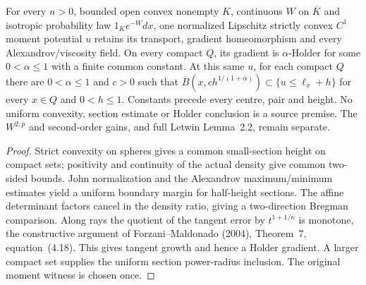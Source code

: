 \begin{lemma}
  \label{lem:convex-gradient-holder}
  \leanok
  For every $n>0$, bounded open convex nonempty $K$, continuous $W$ on $\overline K$
  and isotropic probability law $1_K e^{-W}dx$, one normalized Lipschitz strictly convex
  $C^1$ moment potential $u$ retains its transport, gradient homeomorphism and every
  Alexandrov/viscosity field. On every compact $Q$, its gradient is $\alpha$-Holder
  for some $0<\alpha\le1$ with a finite common constant. At this same $u$, for each
  compact $Q$ there are $0<\alpha\le1$ and $c>0$ such that
  $\overline B(x,ch^{1/(1+\alpha)})\subset\{u\le\ell_x+h\}$ for every $x\in Q$
  and $0<h\le1$. Constants precede every centre, pair and height.
  No uniform convexity, section estimate or Holder conclusion is a source premise.
  The $W^{2,p}$ and second-order gains, and full Letwin Lemma~2.2, remain separate.
\end{lemma}
\begin{proof}
  \leanok
  Strict convexity on spheres gives a common small-section height on compact sets;
  positivity and continuity of the actual density give common two-sided bounds.
  John normalization and the Alexandrov maximum/minimum estimates yield a uniform
  boundary margin for half-height sections. The affine determinant factors cancel
  in the density ratio, giving a two-direction Bregman comparison. Along rays the
  quotient of the tangent error by $t^{1+1/\kappa}$ is monotone, the constructive
  argument of Forzani--Maldonado (2004), Theorem~7, equation~(4.18). This gives
  tangent growth and hence a Holder gradient. A larger compact set supplies the
  uniform section power-radius inclusion. The original moment witness is chosen once.
\end{proof}


